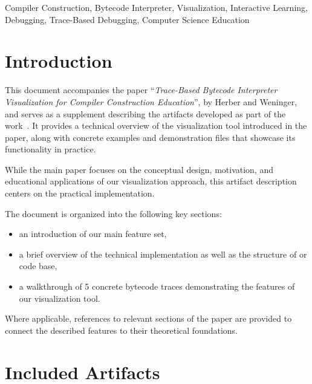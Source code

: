 \documentclass[conference]{IEEEtran}
\begin{document}
\begin{IEEEkeywords}
Compiler Construction, Bytecode Interpreter, Visualization, Interactive Learning, Debugging, Trace-Based Debugging, Computer Science Education
\end{IEEEkeywords}

\section{Introduction}

This document accompanies the paper ``\emph{Trace-Based Bytecode Interpreter Visualization for Compiler Construction Education}'', by Herber and Weninger, and serves as a supplement describing the artifacts developed as part of the work~\cite{herber2025}. It provides a technical overview of the visualization tool introduced in the paper, along with concrete examples and demonstration files that showcase its functionality in practice.

While the main paper focuses on the conceptual design, motivation, and educational applications of our visualization approach, this artifact description centers on the practical implementation.

The document is organized into the following key sections:

\begin{itemize}
    \item an introduction of our main feature set,
    \item a brief overview of the technical implementation as well as the structure of or code base,
    \item a walkthrough of 5 concrete bytecode traces demonstrating the features of our visualization tool.
\end{itemize}

Where applicable, references to relevant sections of the paper are provided to connect the described features to their theoretical foundations.

\section{Included Artifacts}

\end{document}
